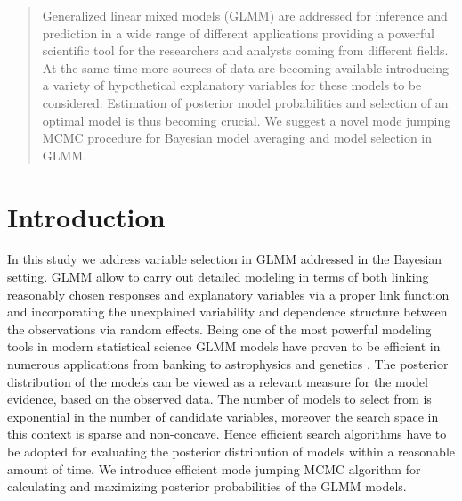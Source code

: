 \documentclass[a0,portrait]{a0poster}
\begin{document}
\begin{multicols}{2} %


\color{Navy} %

\begin{abstract}

Generalized linear mixed models (GLMM) are addressed for inference and prediction in a wide range of different applications providing a powerful scientific tool for the researchers and analysts coming from different fields. At the same time more sources of data are becoming available introducing a variety of hypothetical explanatory variables for these models to be considered. Estimation of posterior model probabilities and selection of an optimal model is thus becoming crucial. We suggest a novel mode jumping MCMC procedure for Bayesian model averaging and model selection in GLMM.

\end{abstract}


\color{SaddleBrown} %

\section*{Introduction}

In this study we address variable selection in GLMM addressed in the Bayesian setting. GLMM allow to carry out detailed modeling in terms of both linking reasonably chosen responses and explanatory variables via a proper link function and incorporating the unexplained variability and dependence structure between the observations via random effects. Being one of the most powerful modeling tools in modern statistical science GLMM models have proven to be efficient in numerous applications from banking to astrophysics and genetics \cite{Hubin2016}. The posterior distribution of the models  can be viewed as a  relevant measure for the model evidence, based on the observed data. The number of models to select from is exponential in the number of candidate variables, moreover the search space in this context is sparse and non-concave. Hence efficient search algorithms have to be adopted for evaluating the posterior distribution of models within a reasonable amount of time. We introduce efficient mode jumping MCMC algorithm for calculating and maximizing posterior probabilities of the GLMM models. 


\end{multicols}
\end{document}
